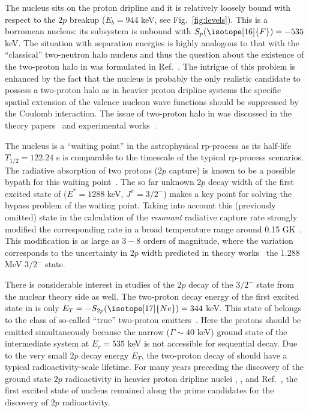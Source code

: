 \documentclass[superscriptaddress,showpacs,showkeys,twoside,floatfix,twocolumn]
{revtex4-1}
\begin{document}
The  nucleus sits on the proton dripline and it is relatively loosely
bound with respect to the \(2p\) breakup
($E_b=944$ keV, see Fig.~\ref{fig:levels}).
This is a borromean nucleus: its  subsystem is unbound
with $S_p(\isotope[16]{F})=-535$ keV.
The situation with  separation energies is highly analogous to
that with the ``classical'' two-neutron halo nucleus  and thus
the question about the existence of the two-proton halo in 
was formulated in Ref.~\cite{Zhukov:1995c}.
The intrigue of this problem is enhanced by the fact that
the  nucleus is probably the only realistic candidate to possess
a two-proton halo
as in heavier proton dripline systems the specific spatial extension
of the valence nucleon wave functions should be suppressed by the Coulomb interaction.
The issue of two-proton halo in  was discussed in
the theory papers~\cite{Grigorenko:2003,Grigorenko:2005}
and experimental works~\cite{Marganiec:2012,Marganiec:2016}.

The  nucleus is a ``waiting point'' in the astrophysical rp-process
as its half-life $T_{1/2}=122.24$ s is comparable to the timescale of
the typical rp-process scenarios.
The radiative absorption of two protons (\(2p\) capture) is known to be
a possible bypath for this waiting point~\cite{Gorres:1995}.
The so far unknown \(2p\) decay width of the first excited state of
 (\(E^*=1288\) keV, \(J^{\pi}=3/2^-\)) makes a key point
for solving the bypass problem of the  waiting point.
Taking into account this (previously omitted) state in the calculation of the
\emph{resonant} radiative capture rate strongly modified the corresponding rate
in a broad temperature range around 0.15 GK~\cite{Grigorenko:2005a}.
This modification is as large as $3-8$ orders of magnitude,
where the variation corresponds to the uncertainty in $2p$ width predicted in
theory works~\cite{Grigorenko:2005a,Grigorenko:2007} the 1.288 MeV $3/2^-$ state.

There is considerable interest in studies of the $2p$ decay of
the $3/2^-$ state from the nuclear theory side as well.
The two-proton decay energy of the first excited state in  is only
$E_T=-S_{2p}(\isotope[17]{Ne})= 344$ keV.
This state of  belongs to the class of so-called
``true'' two-proton emitters~\cite{Pfutzner:2012}.
Here the protons should be emitted simultaneously because
the narrow ($\Gamma \sim 40$ keV) ground state of the intermediate
 system at $E_r=535$ keV is not accessible for sequential decay.
Due to the very small $2p$ decay energy $E_T$,
the two-proton decay of 
should have a typical radioactivity-scale lifetime.
For many years preceding the discovery of the ground state $2p$ radioactivity
in heavier proton dripline nuclei , , and 
Ref.~\cite[and Refs.\ therein]{Pfutzner:2012}, the first excited state of
 nucleus remained along the prime candidates for
the discovery of $2p$ radioactivity.
\end{document}
